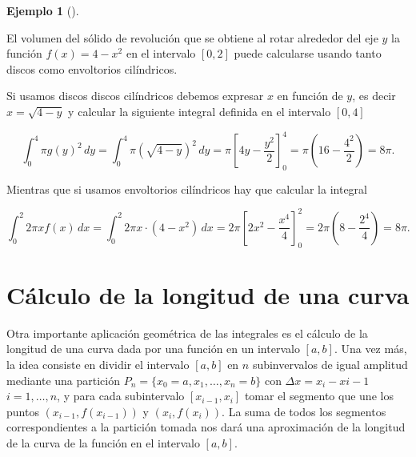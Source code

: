 \documentclass[
  a4paper,
]{scrreport}
\theoremstyle{definition}
\newtheorem{example}{Ejemplo}[chapter]
\theoremstyle{plain}
\theoremstyle{definition}
\theoremstyle{definition}
\theoremstyle{plain}
\theoremstyle{plain}
\theoremstyle{remark}
\begin{document}
\begin{example}[]\protect\hypertarget{exm-volumen-revolucion-envoltorios}{}\label{exm-volumen-revolucion-envoltorios}

El volumen del sólido de revolución que se obtiene al rotar alrededor
del eje \(y\) la función \(f(x)=4-x^2\) en el intervalo \([0,2]\) puede
calcularse usando tanto discos como envoltorios cilíndricos.

Si usamos discos discos cilíndricos debemos expresar \(x\) en función de
\(y\), es decir \(x=\sqrt{4-y}\) y calcular la siguiente integral
definida en el intervalo \([0,4]\)

\[
\int_0^4 \pi g(y)^2\,dy 
= \int_0^4 \pi \left(\sqrt{4-y}\right)^2\,dy 
= \pi\left[4y-\frac{y^2}{2}\right]_0^4 
= \pi\left(16-\frac{4^2}{2}\right) = 8\pi.
\]

Mientras que si usamos envoltorios cilíndricos hay que calcular la
integral

\[
\int_0^2 2\pi x f(x)\,dx
= \int_0^2 2\pi x\cdot  (4-x^2)\,dx 
= 2\pi\left[2x^2-\frac{x^4}{4}\right]_0^2
= 2\pi \left(8-\frac{2^4}{4}\right) 
= 8\pi.
\]

\end{example}

\section{Cálculo de la longitud de una
curva}\label{cuxe1lculo-de-la-longitud-de-una-curva}

Otra importante aplicación geométrica de las integrales es el cálculo de
la longitud de una curva dada por una función en un intervalo \([a,b]\).
Una vez más, la idea consiste en dividir el intervalo \([a,b]\) en \(n\)
subinvervalos de igual amplitud mediante una partición
\(P_n=\{x_0=a, x_1, \ldots, x_n=b\}\) con \(\Delta x = x_i-x{i-1}\)
\(i=1,\ldots,n\), y para cada subintervalo \([x_{i-1}, x_i]\) tomar el
segmento que une los puntos \((x_{i-1}, f(x_{i-1}))\) y
\((x_i,f(x_i))\). La suma de todos los segmentos correspondientes a la
partición tomada nos dará una aproximación de la longitud de la curva de
la función en el intervalo \([a,b]\).
\end{document}

